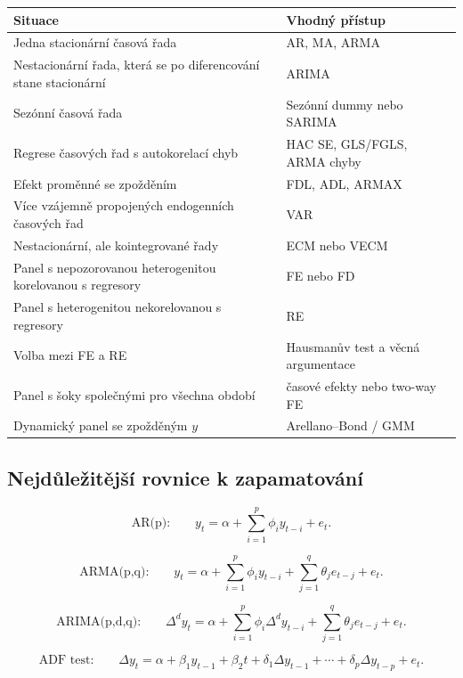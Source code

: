 \begin{center}
\begin{tabular}{|p{}|p{}|}
\hline
\textbf{Situace} & \textbf{Vhodný přístup} \\
\hline
Jedna stacionární časová řada & AR, MA, ARMA \\
\hline
Nestacionární řada, která se po diferencování stane stacionární & ARIMA \\
\hline
Sezónní časová řada & Sezónní dummy nebo SARIMA \\
\hline
Regrese časových řad s autokorelací chyb & HAC SE, GLS/FGLS, ARMA chyby \\
\hline
Efekt proměnné se zpožděním & FDL, ADL, ARMAX \\
\hline
Více vzájemně propojených endogenních časových řad & VAR \\
\hline
Nestacionární, ale kointegrované řady & ECM nebo VECM \\
\hline
Panel s nepozorovanou heterogenitou korelovanou s regresory & FE nebo FD \\
\hline
Panel s heterogenitou nekorelovanou s regresory & RE \\
\hline
Volba mezi FE a RE & Hausmanův test a věcná argumentace \\
\hline
Panel s šoky společnými pro všechna období & časové efekty nebo two-way FE \\
\hline
Dynamický panel se zpožděným $y$ & Arellano--Bond / GMM \\
\hline
\end{tabular}
\end{center}

\subsection{Nejdůležitější rovnice k zapamatování}

\[
    \text{AR(p):}\qquad
    y_t=\alpha+\sum_{i=1}^{p}\phi_i y_{t-i}+e_t.
\]

\[
    \text{ARMA(p,q):}\qquad
    y_t=
    \alpha+
    \sum_{i=1}^{p}\phi_i y_{t-i}
    +
    \sum_{j=1}^{q}\theta_j e_{t-j}
    +e_t.
\]

\[
    \text{ARIMA(p,d,q):}\qquad
    \Delta^d y_t=
    \alpha+
    \sum_{i=1}^{p}\phi_i\Delta^d y_{t-i}
    +
    \sum_{j=1}^{q}\theta_j e_{t-j}
    +e_t.
\]

\[
    \text{ADF test:}\qquad
    \Delta y_t =
    \alpha+\beta_1 y_{t-1}+\beta_2t
    +\delta_1\Delta y_{t-1}
    +\cdots+
    \delta_p\Delta y_{t-p}
    +e_t.
\]

